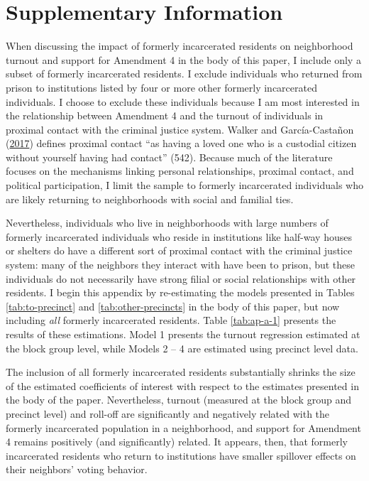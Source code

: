 \documentclass[
  12pt,
]{article}
\begin{document}
\newpage

\hypertarget{supplementary-information}{%
\section*{Supplementary Information}\label{supplementary-information}}

When discussing the impact of formerly incarcerated residents on neighborhood turnout and support for Amendment 4 in the body of this paper, I include only a subset of formerly incarcerated residents. I exclude individuals who returned from prison to institutions listed by four or more other formerly incarcerated individuals. I choose to exclude these individuals because I am most interested in the relationship between Amendment 4 and the turnout of individuals in proximal contact with the criminal justice system. Walker and García-Castañon (\protect\hyperlink{ref-Walker2017}{2017}) defines proximal contact ``as having a loved one who is a custodial citizen without yourself having had contact'' (542). Because much of the literature focuses on the mechanisms linking personal relationships, proximal contact, and political participation, I limit the sample to formerly incarcerated individuals who are likely returning to neighborhoods with social and familial ties.

Nevertheless, individuals who live in neighborhoods with large numbers of formerly incarcerated individuals who reside in institutions like half-way houses or shelters do have a different sort of proximal contact with the criminal justice system: many of the neighbors they interact with have been to prison, but these individuals do not necessarily have strong filial or social relationships with other residents. I begin this appendix by re-estimating the models presented in Tables \ref{tab:to-precinct} and \ref{tab:other-precincts} in the body of this paper, but now including \emph{all} formerly incarcerated residents. Table \ref{tab:ap-a-1} presents the results of these estimations. Model 1 presents the turnout regression estimated at the block group level, while Models 2 -- 4 are estimated using precinct level data.

\begin{singlespace}


\end{singlespace}

The inclusion of all formerly incarcerated residents substantially shrinks the size of the estimated coefficients of interest with respect to the estimates presented in the body of the paper. Nevertheless, turnout (measured at the block group and precinct level) and roll-off are significantly and negatively related with the formerly incarcerated population in a neighborhood, and support for Amendment 4 remains positively (and significantly) related. It appears, then, that formerly incarcerated residents who return to institutions have smaller spillover effects on their neighbors' voting behavior.
\end{document}
